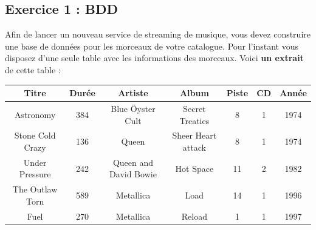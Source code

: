 \documentclass[article,a4paper,firamath,12pt]{nsi}
\begin{document}
\maketitle
{}
\subsection*{Exercice 1 : BDD}
Afin de lancer un nouveau service de streaming de musique, vous devez construire une base de données pour les morceaux de votre catalogue. Pour l'instant vous disposez d'une seule table avec les informations des morceaux. Voici \textbf{un extrait} de cette table :
\begin{center}\tabstyle[UGLiOrange]
    \scriptsize
    \begin{tabular}{|c|c|c|c|c|c|c|}
        \hline
        \rowcolor{UGLiOrange} \color{white}\textbf{Titre} & \color{white}\textbf{Durée} & \color{white}\textbf{Artiste}            & \color{white}\textbf{Album} & \color{white}\textbf{Piste} & \color{white}\textbf{CD} & \color{white}\textbf{Année} \\
        \hline
        Astronomy                                         & 384                         & Blue Öyster Cult                         & Secret Treaties             & 8                           & 1                        & 1974                        \\
        \hline
        Stone Cold Crazy                                  & 136                         & Queen                                    & Sheer Heart attack          & 8                           & 1                        & 1974                        \\
        \hline
        Under Pressure                                    & 242                         & Queen and David Bowie                    & Hot Space                   & 11                          & 2                        & 1982                        \\
        \hline
        The Outlaw Torn                                   & 589                         & Metallica                                & Load                        & 14                          & 1                        & 1996                        \\
        \hline
        Fuel                                              & 270                         & Metallica                                & Reload                      & 1                           & 1                        & 1997                        \\

\end{tabular}
\end{center}
\end{document}
